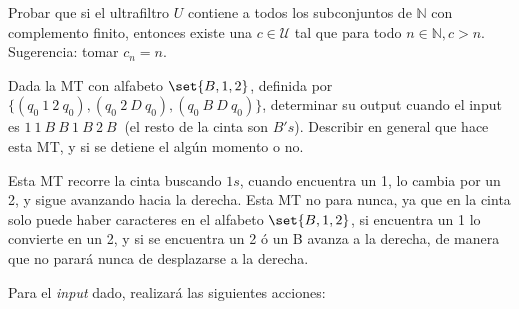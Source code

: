 \begin{problem}
Probar que si el ultrafiltro $U$ contiene a todos los subconjuntos de $\mathbb{N}$ con complemento finito, entonces
existe una $c\in \mathcal{U}$ tal que para todo $n\in \mathbb{N}, c>n$. Sugerencia: tomar $c_n = n$.

\solution

\end{problem}

\begin{problem}
Dada la MT con alfabeto $\set{B, 1, 2}$, definida por $\{(q_0 \ 1 \ 2 \ q_0), (q_0 \ 2 \ D \ q_0),  (q_0 \ B \ D \ q_0)\}$,
determinar su output cuando el input es $1 \ 1  \ B \ B \ 1 \  B  \ 2  \ B \ $ (el resto de la cinta son $B's$). Describir en general que hace esta MT, y si se detiene el algún momento o no.

\solution
Esta MT recorre la cinta buscando $1s$, cuando encuentra un 1, lo cambia por un 2, y sigue avanzando hacia la derecha. Esta MT no para nunca, ya que en la cinta solo puede haber caracteres en el alfabeto $\set{B, 1, 2}$, si encuentra un 1 lo convierte en un 2, y si se encuentra un 2 ó un B avanza a la derecha, de manera que no parará nunca de desplazarse a la derecha.

Para el {\it input} dado, realizará las siguientes acciones:


\end{problem}
